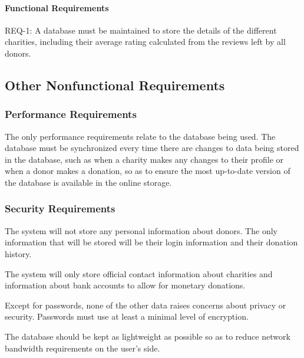 \documentclass{scrreprt}
\begin{document}
            \paragraph{Functional Requirements}\mbox{}\par
            
                REQ-1:	A database must be maintained to store the details of the different charities, including their average rating calculated from the reviews left by all donors.

        \subsection{Other Nonfunctional Requirements}

        \subsubsection{Performance Requirements}

            The only performance requirements relate to the database being used. The database must be synchronized every time there are changes to data being stored in the database, such as when a charity makes any changes to their profile or when a donor makes a donation, so as to ensure the most up-to-date version of the database is available in the online storage.
            
        \newpage
        
        \subsubsection{Security Requirements}
        
            The system will not store any personal information about donors. The only information that will be stored will be their login information and their donation history.\par
            
            The system will only store official contact information about charities and information about bank accounts to allow for monetary donations.\par
            
            Except for passwords, none of the other data raises concerns about privacy or security. Passwords must use at least a minimal level of encryption.\par

            The database should be kept as lightweight as possible so as to reduce network bandwidth requirements on the user’s side.\par
            
\end{document}
